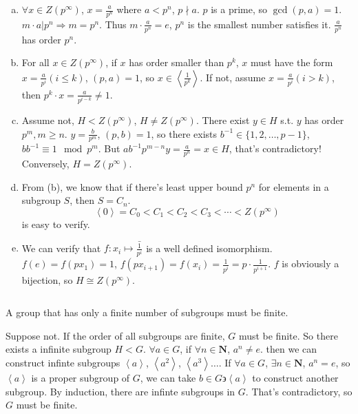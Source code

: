 \begin{answer}
    \begin{enumerate}[(a)]
        \item $\forall  x\in Z(p^{\infty})$, $x=\frac{a}{p^{n}}$ where $a<p^{n}$, $p\nmid a$. $p$ is a prime, so $\gcd(p,a)=1$. $m\cdot a|p^{n}\Rightarrow m=p^{n}$. Thus $m\cdot \frac{a}{p^{n}}=e$, $p^{n}$ is the smallest number satisfies it. $\frac{a}{p^{n}}$ has order $p^{n}$.
        \item For all $x\in Z(p^{\infty})$, if $x$ has order smaller than $p^{k}$, $x$ must have the form $x=\frac{a}{p^{i}}(i\leq k)$, $(p,a)=1$, so $x\in\left\langle\frac{1}{p^{k}}\right\rangle$. If not, assume $x=\frac{a}{p^{i}}(i>k)$, then $p^{k}\cdot x=\frac{a}{p^{i-k}}\neq 1$.
        \item Assume not, $H< Z(p^{\infty})$, $H\neq Z(p^{\infty})$. There exist $y\in H$ s.t. $y$ has order $p^{m}, m\geq n$. $y=\frac{b}{p^{m}}$, $(p,b)=1$, so there exists $b^{-1}\in\{1,2,\dots,p-1\}$, $bb^{-1}\equiv 1\mod p^{m}$. But $ab^{-1}p^{m-n}y=\frac{a}{p^{n}}=x\in H$, that's contradictory! Conversely, $H=Z(p^{\infty})$.
        \item From (b), we know that if there's least upper bound $p^{n}$ for elements in a subgroup $S$, then $S=C_{n}$.\[\left\langle0\right\rangle=C_{0}<C_{1}<C_{2}<C_{3}<\cdots<Z(p^{\infty})\] is easy to verify.
        \item We can verify that $f:x_{i}\mapsto \bar{\frac{1}{p^{i}}}$ is a well defined isomorphism. $f(e)=f(px_{1})=1$, $f(px_{i+1})=f(x_{i})=\frac{1}{p^{i}}=p\cdot \frac{1}{p^{i+1}}$. $f$ is obviously a bijection, so $H\cong Z(p^{\infty})$.
    \end{enumerate}
\end{answer}

$$ $$

\begin{ex}
    A group that has only a finite number of subgroups must be finite.
\end{ex}

\begin{answer}
    Suppose not. If the order of all subgroups are finite, $G$ must be finite. So there exists a infinite subgroup $H<G$. $\forall  a\in G$, if $\forall n\in \mathbf{N}$, $a^{n}\neq e$. then we can construct infinte subgroups $\left\langle a\right\rangle$, $\left\langle a^{2}\right\rangle$, $\left\langle a^{3}\right\rangle\dots$. If $\forall a\in G$, $\exists n\in \mathbf{N}$, $a^{n}=e$, so $\left\langle a\right\rangle$ is a proper subgroup of $G$, we can take $b\in G\backepsilon\left\langle a\right\rangle$ to construct another subgroup. By induction, there are infinte subgroups in $G$. That's contradictory, so $G$ must be finite.
\end{answer}

